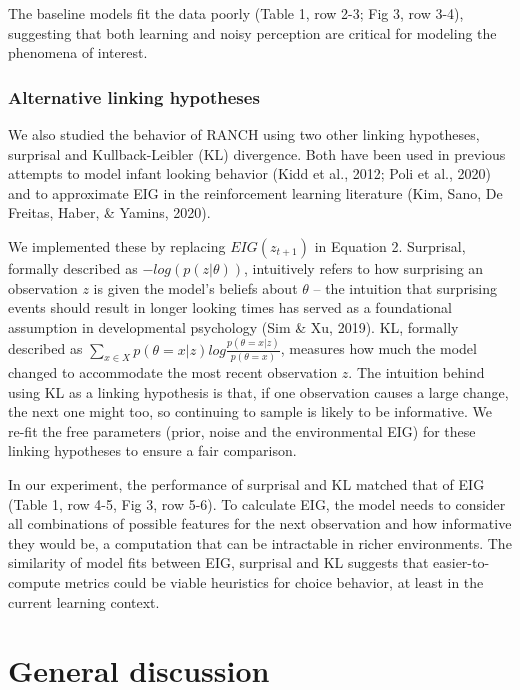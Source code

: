 \documentclass[10pt, letterpaper]{article}
\begin{document}
The baseline models fit the data poorly (Table 1, row 2-3; Fig 3, row
3-4), suggesting that both learning and noisy perception are critical
for modeling the phenomena of interest.

\hypertarget{alternative-linking-hypotheses}{%
\subsubsection{Alternative linking
hypotheses}\label{alternative-linking-hypotheses}}

We also studied the behavior of RANCH using two other linking
hypotheses, surprisal and Kullback-Leibler (KL) divergence. Both have
been used in previous attempts to model infant looking behavior (Kidd et
al., 2012; Poli et al., 2020) and to approximate EIG in the
reinforcement learning literature (Kim, Sano, De Freitas, Haber, \&
Yamins, 2020).

We implemented these by replacing \(EIG(z_{t+1})\) in Equation 2.
Surprisal, formally described as \(-log(p(z|\theta))\), intuitively
refers to how surprising an observation \(z\) is given the model's
beliefs about \(\theta\) -- the intuition that surprising events should
result in longer looking times has served as a foundational assumption
in developmental psychology (Sim \& Xu, 2019). KL, formally described as
\(\sum_{x \in X}{p(\theta = x|z) log \frac{p(\theta = x|z)}{p(\theta = x)}}\),
measures how much the model changed to accommodate the most recent
observation \(z\). The intuition behind using KL as a linking hypothesis
is that, if one observation causes a large change, the next one might
too, so continuing to sample is likely to be informative. We re-fit the
free parameters (prior, noise and the environmental EIG) for these
linking hypotheses to ensure a fair comparison.

In our experiment, the performance of surprisal and KL matched that of
EIG (Table 1, row 4-5, Fig 3, row 5-6). To calculate EIG, the model
needs to consider all combinations of possible features for the next
observation and how informative they would be, a computation that can be
intractable in richer environments. The similarity of model fits between
EIG, surprisal and KL suggests that easier-to-compute metrics could be
viable heuristics for choice behavior, at least in the current learning
context.

\hypertarget{general-discussion}{%
\section{General discussion}\label{general-discussion}}
\end{document}
